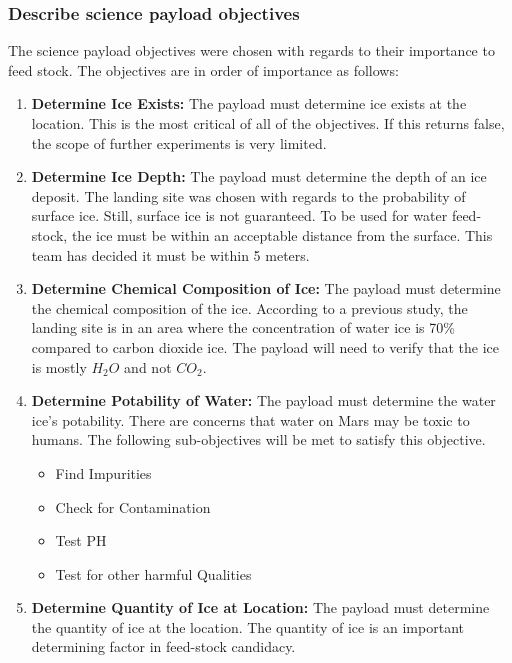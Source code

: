 \documentclass[%
 portrait,
 aapm,
 mph,%
 amsmath,amssymb,
 reprint,%
]{revtex4-2}
\begin{document}
\subsubsection{Describe science payload objectives}
The science payload objectives were chosen with regards to their importance to feed stock. The objectives are in order of importance as follows: 
\begin{enumerate}
    \item \textbf{Determine Ice Exists:} The payload must determine ice exists at the location. This is the most critical of all of the objectives. If this returns false, the scope of further experiments is very limited. 
    \item \textbf{Determine Ice Depth:} The payload must determine the depth of an ice deposit. The landing site was chosen with regards to the probability of surface ice. Still, surface ice is not guaranteed. To be used for water feed-stock, the ice must be within an acceptable distance from the surface. This team has decided it must be within 5 meters. 
    \item \textbf{Determine Chemical Composition of Ice:} The payload must determine the chemical composition of the ice. According to a previous study, the landing site is in an area where the concentration of water ice is 70\% compared to carbon dioxide ice. \cite{Mangold2016}  The payload will need to verify that the ice is mostly \begin{math} H_2O \end{math} and not \begin{math} CO_2 \end{math}.
    
    \item \textbf{Determine Potability of Water:} The payload must determine the water ice's potability. There are concerns that water on Mars may be toxic to humans. \cite{Mangold2016} The following sub-objectives will be met to satisfy this objective. 
    \begin{itemize}
        \item Find Impurities
        \item Check for Contamination
        \item Test PH
        \item Test for other harmful Qualities
    \end{itemize}
    \item \textbf{Determine Quantity of Ice at Location:} The payload must determine the quantity of ice at the location. The quantity of ice is an important determining factor in feed-stock candidacy.
\end{enumerate}
\end{document}
